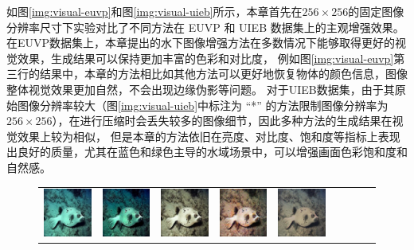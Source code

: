 如图\ref{img:visual-euvp}和图\ref{img:visual-uieb}所示，本章首先在$256 \times 256$的固定图像分辨率尺寸下实验对比了不同方法在 EUVP 和 UIEB 数据集上的主观增强效果。
在EUVP数据集上，本章提出的水下图像增强方法在多数情况下能够取得更好的视觉效果，生成结果可以保持更加丰富的色彩和对比度，
例如图\ref{img:visual-euvp}第三行的结果中，本章的方法相比如其他方法可以更好地恢复物体的颜色信息，图像整体视觉效果更加自然，不会出现边缘伪影等问题。
对于UIEB数据集，由于其原始图像分辨率较大（图\ref{img:visual-uieb}中标注为 “*” 的方法限制图像分辨率为 $256 \times 256$），在进行压缩时会丢失较多的图像细节，因此多种方法的生成结果在视觉效果上较为相似，
但是本章的方法依旧在亮度、对比度、饱和度等指标上表现出良好的质量，尤其在蓝色和绿色主导的水域场景中，可以增强画面色彩饱和度和自然感。
\begin{figure}[t]
    \vspace{1mm}
	\begin{center}
		\begin{tabular}{ccccccccc}
			\includegraphics[width = 0.10\linewidth,height=0.10\linewidth]{figures/ch3/compare/EUVP/Input/264318_n02655020_17544.JPEG} & \hspace{-0.40cm}
			\includegraphics[width = 0.10\linewidth,height=0.10\linewidth]{figures/ch3/compare/EUVP/UDCP/264318_n02655020_17544.JPEG}  & \hspace{-0.40cm}
			\includegraphics[width = 0.10\linewidth,height=0.10\linewidth]{figures/ch3/compare/EUVP/UGAN/264318_n02655020_17544.JPEG}  & \hspace{-0.40cm}
			\includegraphics[width = 0.10\linewidth,height=0.10\linewidth]{figures/ch3/compare/EUVP/FGAN/264318_n02655020_17544.JPEG}  & \hspace{-0.40cm}
			\includegraphics[width = 0.10\linewidth,height=0.10\linewidth]{figures/ch3/compare/EUVP/UWCNN/264318_n02655020_17544.JPEG} & \hspace{-0.40cm}

\end{tabular}
\end{center}
\end{figure}
